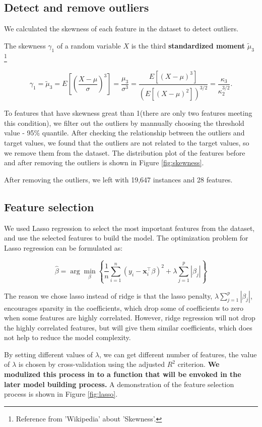 \documentclass[12pt]{article}
\begin{document}
\subsection{Detect and remove outliers}
We calculated the skewness of each feature in the dataset to detect outliers.

The skewness $\gamma_1$ of a random variable $X$ is the third \textbf{{standardized moment}} 
$\tilde{\mu}_3$ \footnote{Reference from 'Wikipedia' about 'Skewness'.}

\[
\gamma_1 = \tilde{\mu}_3 = E \left[ \left( \frac{X - \mu}{\sigma} \right)^3 \right] = \frac{\mu_3}{\sigma^3} = \frac{E[(X - \mu)^3]}{\left(E[(X - \mu)^2]\right)^{3/2}} = \frac{\kappa_3}{\kappa_2^{3/2}}.
\]

To features that have skewness great than 1(there are only two features meeting this condition),
we filter out the outliers by mannually choosing the threshold value - 95\% quantile. After checking the relationship between
the outliers and target values, we found that the outliers are not related to the target values, so we remove them from the dataset. 
The distribution plot of the features before and after removing the outliers is shown in Figure \ref{fig:skewness}.

After removing the outliers, we left with 19,647 instances and 28 features.

\subsection{Feature selection}
We used Lasso regression to select the most important features from the dataset, and use the selected features to build the model.
The optimization problem for Lasso regression can be formulated as:

\[
\hat{\beta} = \arg\min_{\beta} \left\{ \frac{1}{n} \sum_{i=1}^n \left( y_i - \mathbf{x}_i^\top \beta \right)^2 + \lambda \sum_{j=1}^p |\beta_j| \right\}
\]

The reason we chose lasso instead of ridge is that the lasso penalty, \( \lambda \sum_{j=1}^p |\beta_j| \), encourages sparsity in the coefficients, 
which drop some of coefficients to zero when some features are highly correlated. However, ridge regression will not 
drop the highly correlated features, but will give them similar coefficients, which does not help to reduce the model complexity.

By setting different values of \(\lambda\), we can get different number of features, the value of \(\lambda\) is chosen by cross-validation using 
the adjusted \(R^2\) criterion. 
\textbf{We modulized this process in to a function that will be envoked in the later model building process.} 
A demonstration of the feature selection process is shown in Figure \ref{fig:lasso}.
\end{document}
